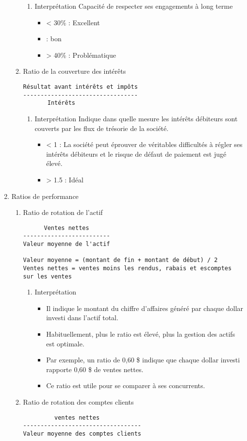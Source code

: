 \documentclass[11pt]{article}
\begin{document}
\begin{enumerate}
\begin{enumerate}
\begin{enumerate}
\item Interprétation
\label{sec:orgf5abbad}
Capacité de respecter ses engagements à long terme
\begin{itemize}
\item < 30\% : Excellent
\item\relax [30\%, 36\%] : bon
\item > 40\% : Problématique
\end{itemize}
\end{enumerate}
\item Ratio de la couverture des intérêts
\label{sec:orge3af0d2}
\begin{verbatim}
Résultat avant intérêts et impôts
---------------------------------
       Intérêts
\end{verbatim}
\begin{enumerate}
\item Interprétation
\label{sec:org9e6b93c}
Indique dans quelle mesure les intérêts débiteurs sont couverts par les flux de
trésorie de la société.
\begin{itemize}
\item < 1 : La société peut éprouver de véritables difficultés à régler ses intérêts
débiteurs et le risque de défaut de paiement est jugé élevé.
\item > 1.5 : Idéal
\end{itemize}
\end{enumerate}
\end{enumerate}
\item Ratios de performance
\label{sec:org4b0a0ac}
\begin{enumerate}
\item Ratio de rotation de l'actif
\label{sec:org277d6ca}
\begin{verbatim}
      Ventes nettes
-------------------------
Valeur moyenne de l'actif

Valeur moyenne = (montant de fin + montant de début) / 2
Ventes nettes = ventes moins les rendus, rabais et escomptes sur les ventes
\end{verbatim}
\begin{enumerate}
\item Interprétation
\label{sec:org7f79466}
\begin{itemize}
\item Il indique le montant du chiffre d'affaires généré par chaque dollar investi
dans l'actif total.
\item Habituellement, plus le ratio est élevé, plus la gestion des actifs est
optimale.
\item Par exemple, un ratio de 0,60 \$ indique que chaque dollar investi rapporte
0,60 \$ de ventes nettes.
\item Ce ratio est utile pour se comparer à ses concurrents.
\end{itemize}
\end{enumerate}
\item Ratio de rotation des comptes clients
\label{sec:org939bf8e}
\begin{verbatim}
         ventes nettes
----------------------------------
Valeur moyenne des comptes clients


\end{verbatim}
\end{enumerate}
\end{enumerate}
\end{document}
